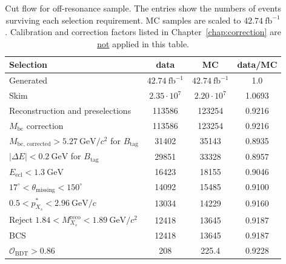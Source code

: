 \begin{table}
\caption{Cut flow for off-resonance sample. The entries show the numbers of events surviving each selection requirement. MC samples are scaled to $42.74~\textrm{fb}^{-1}$. Calibration and correction factors listed in Chapter~\ref{chap:correction} are \underline{not} applied in this table.}
  \renewcommand{\arraystretch}{1.2}
  \centering
\begin{tabular}{ p{7cm} ||  p{3cm} | p{3cm} | p{3cm}  }
 \hline
  \hline
Selection &  \multicolumn{1}{c}{data} & \multicolumn{1}{c|}{MC} & \multicolumn{1}{c}{data/MC}\\
 \hline
Generated & \multicolumn{1}{c}{$42.74~\textrm{fb}^{-1}$} & \multicolumn{1}{c|}{$42.74~\textrm{fb}^{-1}$} & \multicolumn{1}{c}{1.0} \\
Skim & \multicolumn{1}{c}{$2.35\cdot10^{7}$} & \multicolumn{1}{c|}{$2.20\cdot10^{7}$}& \multicolumn{1}{c}{1.0693} \\
Reconstruction and preselections & \multicolumn{1}{c}{113586} & \multicolumn{1}{c|}{123254}& \multicolumn{1}{c}{0.9216} \\
$M_{\textrm{bc}}$ correction & \multicolumn{1}{c}{113586} & \multicolumn{1}{c|}{123254}& \multicolumn{1}{c}{0.9216} \\
$M_{\textrm{bc, corrected}}>5.27~\textrm{GeV}/c^{2}$ for $B_{\textrm{tag}}$ & \multicolumn{1}{c}{31402} & \multicolumn{1}{c|}{35143}& \multicolumn{1}{c}{0.8935} \\
$\left|\Delta E \right|<0.2~\textrm{GeV}$ for $B_{\textrm{tag}}$ & \multicolumn{1}{c}{29851} & \multicolumn{1}{c|}{33328}& \multicolumn{1}{c}{0.8957} \\
$E_{\textrm{ecl}}<1.3~\textrm{GeV}$ & \multicolumn{1}{c}{16423} & \multicolumn{1}{c|}{18155}& \multicolumn{1}{c}{0.9046} \\
$17^\circ < \theta_{\textrm{missing}} < 150^\circ$ & \multicolumn{1}{c}{14092} & \multicolumn{1}{c|}{15485}& \multicolumn{1}{c}{0.9100} \\
$0.5<p_{X_{s}}^{*}<2.96~\textrm{GeV}/c$ & \multicolumn{1}{c}{13034} & \multicolumn{1}{c|}{14229}& \multicolumn{1}{c}{0.9160} \\
Reject $1.84 < M_{X_{s}}^{\textrm{reco}} < 1.89~\textrm{GeV}/c^{2}$ & \multicolumn{1}{c}{12418} & \multicolumn{1}{c|}{13645}& \multicolumn{1}{c}{0.9187} \\
BCS & \multicolumn{1}{c}{12418} & \multicolumn{1}{c|}{13645}& \multicolumn{1}{c}{0.9187} \\
$\mathcal{O}_{\textrm{BDT}} > 0.86$ & \multicolumn{1}{c}{208} & \multicolumn{1}{c|}{225.4}& \multicolumn{1}{c}{0.9228} \\
  \hline
   \hline
\end{tabular}
    \label{tab:cutflow_off}
\end{table}
